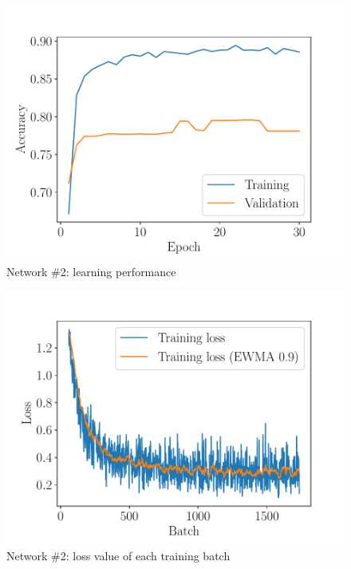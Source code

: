 \documentclass[10pt,a4paper,twocolumn]{article}
\begin{document}
\begin{figure}
    \centering \includegraphics[width=\linewidth]{plot_dnn_macc}
    \caption{Network \#2: learning performance}
\end{figure}

\begin{figure}
    \centering \includegraphics[width=\linewidth]{plot_dnn_loss}
    \caption{Network \#2: loss value of each training batch}
\end{figure}
\end{document}
